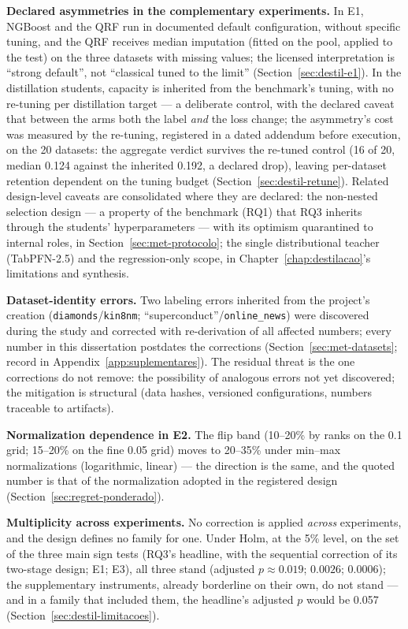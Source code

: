 \textbf{Declared asymmetries in the complementary experiments.} In
E1, NGBoost and the QRF run in documented default configuration,
without specific tuning, and the QRF receives median imputation
(fitted on the pool, applied to the test) on the three datasets with
missing values; the licensed interpretation is ``strong default'',
not ``classical tuned to the limit''
(Section~\ref{sec:destil-e1}). In the distillation students,
capacity is inherited from the benchmark's tuning, with no
re-tuning per distillation target --- a deliberate control, with
the declared caveat that between the arms both the label \emph{and}
the loss change; the asymmetry's cost was measured by the
re-tuning, registered in a dated addendum before execution, on the
20 datasets: the aggregate verdict survives the re-tuned control
(16 of 20, median 0.124 against the inherited 0.192, a declared
drop), leaving per-dataset retention dependent on the tuning budget
(Section~\ref{sec:destil-retune}). Related design-level caveats are
consolidated where they are declared: the non-nested selection
design --- a property of the benchmark (RQ1) that RQ3 inherits
through the students' hyperparameters --- with its optimism
quarantined to internal roles, in
Section~\ref{sec:met-protocolo}; the single distributional teacher
(TabPFN-2.5) and the regression-only scope, in
Chapter~\ref{chap:destilacao}'s limitations and synthesis.

\textbf{Dataset-identity errors.} Two labeling errors inherited
from the project's creation (\texttt{diamonds}/\texttt{kin8nm};
``superconduct''/\texttt{online\_news}) were discovered during the
study and corrected with re-derivation of all affected numbers;
every number in this dissertation postdates the corrections
(Section~\ref{sec:met-datasets}; record in
Appendix~\ref{app:suplementares}). The residual threat is the one
corrections do not remove: the possibility of analogous errors not
yet discovered; the mitigation is structural (data hashes,
versioned configurations, numbers traceable to artifacts).

\textbf{Normalization dependence in E2.} The flip band (10--20\% by
ranks on the 0.1 grid; 15--20\% on the fine 0.05 grid) moves to
20--35\% under min--max normalizations (logarithmic,
linear) --- the direction is the same, and the quoted number is
that of the normalization adopted in the registered design
(Section~\ref{sec:regret-ponderado}).

\textbf{Multiplicity across experiments.} No correction is applied
\emph{across} experiments, and the design defines no family for
one. Under Holm, at the 5\% level, on the set of the three main
sign tests (RQ3's headline, with the sequential correction of its
two-stage design; E1; E3), all three stand (adjusted
$p \approx 0.019$; $0.0026$; $0.0006$); the supplementary
instruments, already borderline on their own, do not stand --- and
in a family that included them, the headline's adjusted $p$ would
be 0.057
(Section~\ref{sec:destil-limitacoes}).

